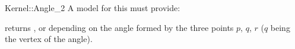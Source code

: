 \begin{ccRefFunctionObjectConcept}{Kernel::Angle_2}
A model for this must provide:


{returns ,  or  depending
on the angle formed by the three points $p$, $q$, $r$ ($q$ being the vertex of
the angle).}

\end{ccRefFunctionObjectConcept}
